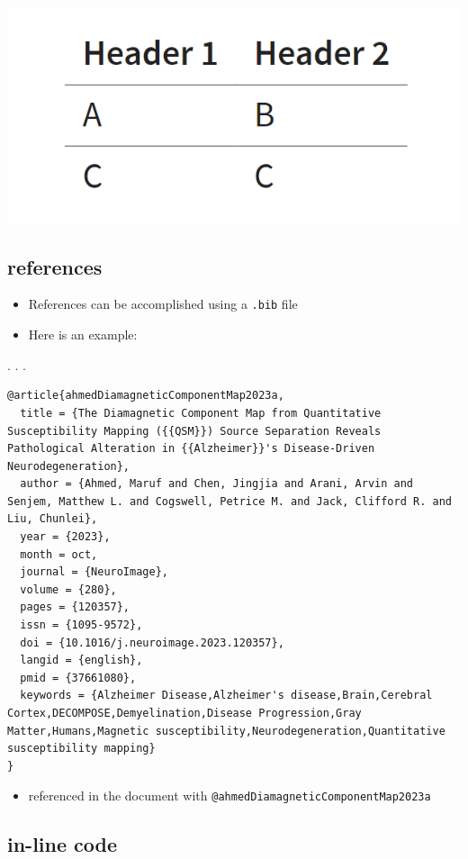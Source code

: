 \documentclass[
  letterpaper,
  DIV=11,
  numbers=noendperiod]{scrartcl}
\providecommand{\tightlist}{%
  \setlength{\itemsep}{0pt}\setlength{\parskip}{0pt}}\usepackage{longtable,booktabs,array}
\begin{document}
\includegraphics{img/latextablerendered.png}

\subsection{references}\label{references}

\begin{itemize}
\item
  References can be accomplished using a \texttt{.bib} file
\item
  Here is an example:
\end{itemize}

. . .

\begin{verbatim}
@article{ahmedDiamagneticComponentMap2023a,
  title = {The Diamagnetic Component Map from Quantitative Susceptibility Mapping ({{QSM}}) Source Separation Reveals Pathological Alteration in {{Alzheimer}}'s Disease-Driven Neurodegeneration},
  author = {Ahmed, Maruf and Chen, Jingjia and Arani, Arvin and Senjem, Matthew L. and Cogswell, Petrice M. and Jack, Clifford R. and Liu, Chunlei},
  year = {2023},
  month = oct,
  journal = {NeuroImage},
  volume = {280},
  pages = {120357},
  issn = {1095-9572},
  doi = {10.1016/j.neuroimage.2023.120357},
  langid = {english},
  pmid = {37661080},
  keywords = {Alzheimer Disease,Alzheimer's disease,Brain,Cerebral Cortex,DECOMPOSE,Demyelination,Disease Progression,Gray Matter,Humans,Magnetic susceptibility,Neurodegeneration,Quantitative susceptibility mapping}
}
\end{verbatim}

\begin{itemize}
\tightlist
\item
  referenced in the document with
  \texttt{@ahmedDiamagneticComponentMap2023a}
\end{itemize}

\subsection{in-line code}\label{in-line-code}
\end{document}
